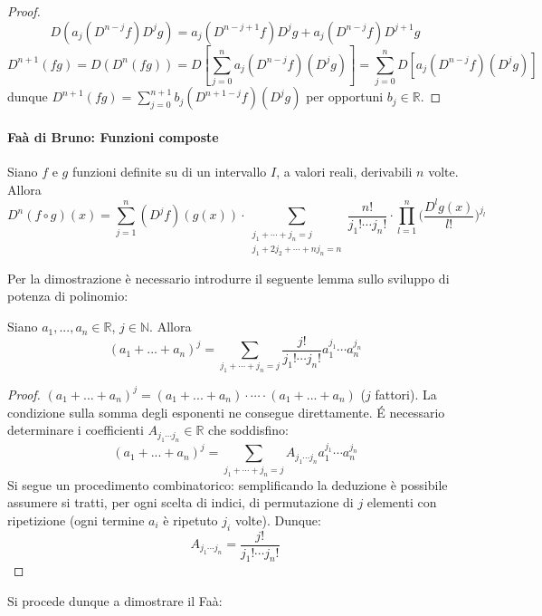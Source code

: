 \documentclass[10pt]{article}
\theoremstyle{plain}
\begin{document}
\begin{proof}
\[D(a_j(D^{n-j}f)D^jg) = a_j(D^{n-j+1}f)D^jg + a_j(D^{n-j}f)D^{j+1}g\]
\[D^{n+1}(fg) = D(D^n(fg)) = D [\sum \limits_{j=0}^{n} a_j (D^{n-j}f)(D^jg)] = \sum \limits_{j=0}^{n} D[ a_j (D^{n-j}f)(D^jg)]\]
dunque $D^{n+1}(fg) = \sum \limits_{j=0}^{n+1} b_j (D^{n+1-j}f)(D^jg)$ per opportuni $b_j \in \mathbb{R}$.
\end{proof}

\paragraph{Faà di Bruno: Funzioni composte}
\begin{ther}
    Siano $f$ e $g$ funzioni definite su di un intervallo $I$, a valori reali, derivabili $n$ volte. Allora
    \[D^n(f\circ g)(x) = \sum \limits_{j = 1}^{n} (D^jf)(g(x)) \cdot \sum_{\substack{j_1 + \cdots + j_n = j \\ j_1 + 2 j_2 + \cdots + n j_n = n}} \frac{n!}{j_1! \cdots j_n!} \cdot \prod\limits_{l=1}^n\bigg(\frac{D^lg(x)}{l!}\bigg)^{j_l}\]
\end{ther}
Per la dimostrazione è necessario introdurre il seguente lemma sullo sviluppo di potenza di polinomio: 
\begin{lem}
Siano $a_1, ..., a_n \in \mathbb{R}$, $j \in \mathbb{N}$. Allora
\[(a_1 + ... + a_n)^j = \sum \limits_{j_1 + \cdots + j_n = j} \frac{j!}{j_1! \cdots j_n!}a_1^{j_1} \cdots a_n^{j_n}\]
\end{lem}
\begin{proof}
    $(a_1 + ... + a_n)^j = (a_1 + ... + a_n) \cdot \cdots \cdot (a_1 + ... + a_n)$ ($j$ fattori). La condizione sulla somma degli esponenti ne consegue direttamente. \'E necessario determinare i coefficienti $A_{j_1 \cdots j_n} \in \mathbb{R}$ che soddisfino:
    \[(a_1 + ... + a_n)^j = \sum \limits_{j_1 + \cdots + j_n = j} A_{j_1 \cdots j_n} a_1^{j_1} \cdots a_n^{j_n}\]
    Si segue un procedimento combinatorico: semplificando la deduzione è possibile assumere si tratti, per ogni scelta di indici, di permutazione di $j$ elementi con ripetizione (ogni termine $a_i$ è ripetuto $j_i$ volte). Dunque:
    \[A_{j_1 \cdots j_n} = \frac{j!}{j_1! \cdots j_n!}\]
\end{proof}
Si procede dunque a dimostrare il Faà:
\end{document}

